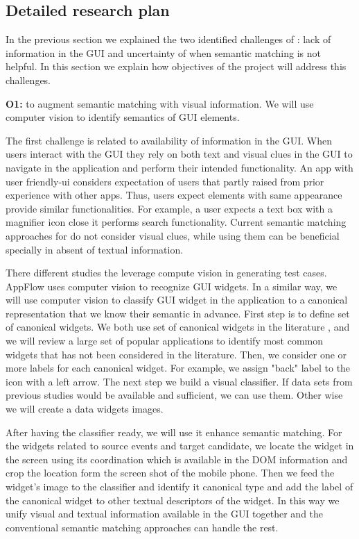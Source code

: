 \subsection{Detailed research plan}

In the previous section we explained the two identified challenges of \testreuse: lack of information in the GUI and uncertainty of \testreuse when semantic matching is not helpful.
In this section we explain how objectives of the project will address this challenges. 

\bigskip
\noindent
\textbf{O1:} to augment semantic matching with visual information.  
We will use computer vision to identify semantics of GUI elements. 

\bigskip
The first challenge is related to availability of information in the GUI. 
When users interact with the GUI they rely on both text and visual clues in the GUI to navigate in the application and perform their intended functionality. 
An app with user friendly-ui considers expectation of users that partly raised from prior experience with other apps. 
Thus, users expect elements with same appearance provide similar functionalities. 
For example, a user expects  a text box with a magnifier icon close it performs search functionality. 
Current semantic matching approaches for \testreuse do not consider visual clues, while using them can be  beneficial specially in absent of textual information.

\bigskip
There different studies the leverage compute vision in generating test cases. 
AppFlow\cite{Hu:appflow:FSE:2018} uses computer vision to recognize GUI widgets. 
In a similar way, we  will use computer vision to  classify GUI widget in the application to a canonical representation that we know their semantic in advance. 
%
First step is to define set of canonical widgets.
We both use set of canonical widgets in the literature , and we will review a large set of popular applications to identify most common widgets that has not been considered in the literature.
% 
Then, we consider one or more labels for each canonical widget. 
For example, we assign "back" label to the icon with a left arrow. 
%
The next step  we build a visual classifier. 
If data sets from previous studies would be available and sufficient, we can use them. 
Other wise we will create a data widgets images. 

\bigskip
\noindent
After having the classifier ready, we will use it enhance semantic matching. 
For the widgets related to source events and target candidate, we locate the widget in the screen using its coordination which is available in the DOM information and crop the location form the screen shot of the mobile phone.
Then we feed the widget's image to the classifier and identify it canonical type and add the label of the canonical widget to other textual descriptors of the widget.
In this way we unify visual and textual information available in the GUI together and the conventional semantic matching approaches can handle the rest. 


